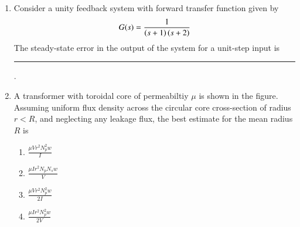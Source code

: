 \documentclass[journal,12pt,onecolumn]{IEEEtran}
\theoremstyle{remark}
\begin{document}
\begin{enumerate}
\item Consider a unity feedback system with forward transfer function given by 
\[
G(s)=\frac{1}{\left(s+1\right)\left(s+2\right)}
\]
The steady-state error in the output of the system for a unit-step input is \rule{2cm}{0.4pt}.

\item A transformer with toroidal core of permeabiltiy $\mu$ is shown in the figure. Assuming uniform flux density across the circular core cross-section of radius $r<R$, and neglecting any leakage flux, the best estimate for the mean radius $R$ is


\begin{enumerate}
\item $\frac{\mu Vr^2N_p^2w}{I}$
\item $\frac{\mu Ir^2N_pN_sw}{V}$
\item $\frac{\mu Vr^2N_p^2w}{2I}$
\item $\frac{\mu Ir^2N_p^2w}{2V}$
\end{enumerate}
\end{enumerate}
\end{document}
